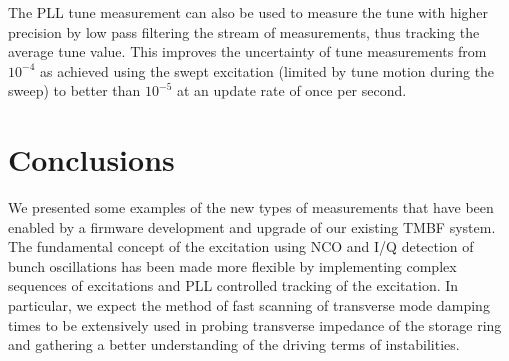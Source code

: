\documentclass[a4paper]{jacow}
\begin{document}
The PLL tune measurement can also be used to measure the tune with higher precision by low pass filtering the stream of measurements, thus tracking the average tune value. This improves the uncertainty of tune measurements from $10^{-4}$ as achieved using the swept excitation (limited by tune motion during the sweep) to better than $10^{-5}$ at an update rate of once per second.

\section{Conclusions}
We presented some examples of the new types of measurements that have been enabled by a firmware development and upgrade of our existing TMBF system. The fundamental concept of the excitation using NCO and I/Q detection of bunch oscillations has been made more flexible by implementing complex sequences of excitations and PLL controlled tracking of the excitation. In particular, we expect the method of fast scanning of transverse mode damping times to be extensively used in probing transverse impedance of the storage ring and gathering a better understanding of the driving terms of instabilities.
\end{document}
